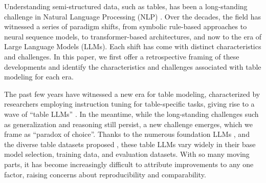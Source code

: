 \documentclass[11pt]{article}
\begin{document}
Understanding semi-structured data, such as tables, has been a long-standing challenge in Natural Language Processing (NLP) \citep{woods1972lunar, warren-pereira-1982-efficient, reiter2005choosing, pasupat-liang-2015-compositional, yu-etal-2018-spider, xie-etal-2022-unifiedskg, zhang-etal-2024-tablellama}. 
Over the decades, the field has witnessed a series of paradigm shifts, from symbolic rule-based approaches to neural sequence models, to transformer-based architectures, and now to the era of Large Language Models (LLMs). 
Each shift has come with distinct characteristics and challenges. 
In this paper, we first offer a retrospective framing of these developments and identify the characteristics and challenges associated with table modeling for each era.

The past few years have witnessed a new era for table modeling, characterized by researchers employing instruction tuning for table-specific tasks, giving rise to a wave of ``table LLMs'' \citep{li2023table, zhang-etal-2024-tablellama, zhang2024tablellm, zheng-etal-2024-multimodal, su2024tablegpt2, deng2025rethinking}. 
In the meantime, while the long-standing challenges such as generalization \citep{warren-pereira-1982-efficient, yu-etal-2018-spider, suhr-etal-2020-exploring, deng2025rethinking} and reasoning \citep{liu2018table, xie-etal-2022-unifiedskg, wu2025mmqa} still persist, a new challenge emerges, which we frame as ``paradox of choice''.
Thanks to the numerous foundation LLMs \citep{touvron2023llama, dubey2024llama, jiang2023mistral}, and the diverse table datasets proposed \citep{cheng-etal-2022-hitab, nan-etal-2022-fetaqa}, these table LLMs vary widely in their base model selection, training data, and evaluation datasets. 
With so many moving parts, it has become increasingly difficult to attribute improvements to any one factor, raising concerns about reproducibility and comparability.
\end{document}
